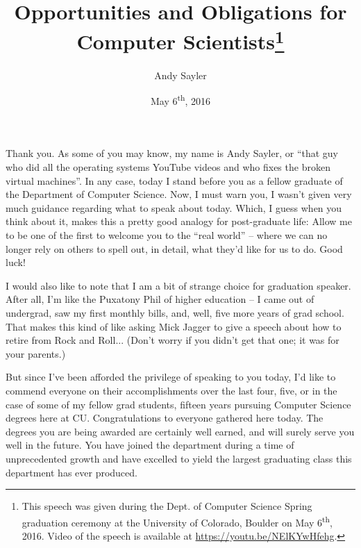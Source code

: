 \documentclass[11pt,twocolumn,letterpaper]{article}
\begin{document}
\title{Opportunities and Obligations for Computer
  Scientists\footnote{This speech was given during the Dept. of
    Computer Science Spring graduation ceremony at the University of
    Colorado, Boulder on May 6\textsuperscript{th}, 2016. Video of the
    speech is available at \url{https://youtu.be/NElKYwHfehg}.}}

\author{Andy Sayler}

\date{May 6\textsuperscript{th}, 2016}

\maketitle

Thank you. As some of you may know, my name is Andy Sayler, or ``that
guy who did all the operating systems YouTube videos and who fixes the
broken virtual machines''. In any case, today I stand before you as a
fellow graduate of the Department of Computer Science. Now, I must
warn you, I wasn't given very much guidance regarding what to speak
about today. Which, I guess when you think about it, makes this a
pretty good analogy for post-graduate life: Allow me to be one of the
first to welcome you to the ``real world'' -- where we can no longer
rely on others to spell out, in detail, what they'd like for us to
do. Good luck!

I would also like to note that I am a bit of strange choice for
graduation speaker. After all, I'm like the Puxatony Phil of higher
education -- I came out of undergrad, saw my first monthly bills, and,
well, five more years of grad school. That makes this kind of like
asking Mick Jagger to give a speech about how to retire from Rock and
Roll... (Don't worry if you didn't get that one; it was for your
parents.)

But since I've been afforded the privilege of speaking to you today,
I'd like to commend everyone on their accomplishments over the last
four, five, or in the case of some of my fellow grad students, fifteen
years pursuing Computer Science degrees here at CU. Congratulations to
everyone gathered here today. The degrees you are being awarded are
certainly well earned, and will surely serve you well in the
future. You have joined the department during a time of unprecedented
growth and have excelled to yield the largest graduating class this
department has ever produced.
\end{document}
